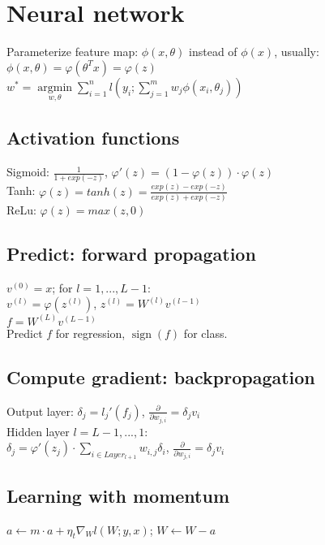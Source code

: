 \section*{Neural network}
Parameterize feature map: $\phi(x,\theta)$ instead of $\phi(x)$, usually: $\phi(x,\theta) = \varphi(\theta^T x) = \varphi(z)$\\
$w^* = \underset{w, \theta}{\operatorname{argmin}} \sum_{i=1}^n l(y_i; \sum_{j=1}^m w_j \phi(x_i, \theta_j))$

\subsection*{Activation functions}
Sigmoid: $\frac{1}{1+exp(-z)}$,  $\varphi'(z) = (1 - \varphi(z))\cdot\varphi(z)$\\
Tanh: $\varphi(z) = tanh(z) = \frac{exp(z)-exp(-z)}{exp(z)+exp(-z)}$\\
ReLu:  $\varphi(z) = max(z,0)$

\subsection*{Predict: forward propagation}
$v^{(0)} = x$; for $l = 1,...,L-1$: \\
$v^{(l)} = \varphi(z^{(l)})$, $z^{(l)} = W^{(l)}v^{(l-1)}$\\
$f = W^{(L)}v^{(L-1)}$\\
Predict $f$ for regression, $\operatorname{sign}(f)$ for class.

\subsection*{Compute gradient: backpropagation}
Output layer: 
$\delta_j = l_j'(f_j)$,
$\frac{\partial}{\partial w_{j,i}} = \delta_j v_i$\\
Hidden layer $l=L-1,...,1$:\\
$\delta_j = \varphi'(z_j) \cdot \sum_{i\in Layer_{l+1}} w_{i,j}\delta_i$,
$\frac{\partial}{\partial w_{j,i}} = \delta_j v_i$

\subsection*{Learning with momentum}
$a \leftarrow m \cdot a + \eta_t \nabla_W l(W;y,x)$; $W \leftarrow W - a$